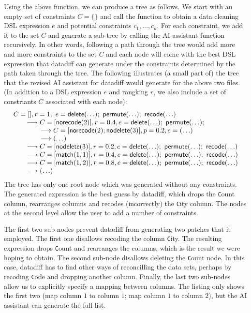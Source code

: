 \documentclass{article}
\begin{document}
Using the above function, we can produce a tree as follows. We start with an empty set of 
constraints $C=\{\}$ and call the function to obtain a data cleaning DSL expression $e$ and
potential constraints $c_1, \ldots, c_k$. For each constraint, we add it to the set $C$ and
generate a sub-tree by calling the AI assistant function recursively. In other words, following
a path through the tree would add more and more constraints to the set $C$ and each node will
come with the best DSL expression that datadiff can generate under the constraints determined
by the path taken through the tree. The following illustrates (a small part of) the tree that 
the revised AI assistant for datadiff would generate for the above two files. (In addition to a DSL 
expression $e$ and rangking $r$, we also include a set of constriants $C$ associated with each 
node):
%
\begin{equation*}
\begin{array}{l}
C=[], r=1,~ e=\textnormal{\sffamily delete}(\ldots);~ \textnormal{\sffamily permute}(\ldots);~ \textnormal{\sffamily recode}(\ldots)\\
\qquad\longrightarrow C=[\textnormal{\sffamily norecode}(2)], r=0.4, e=\textnormal{\sffamily delete}(\ldots);~ \textnormal{\sffamily permute}(\ldots);\\
\qquad\qquad\longrightarrow C=[\textnormal{\sffamily norecode}(2); \textnormal{\sffamily nodelete}(3)], p=0.2, e=(\ldots)\\
\qquad\qquad\longrightarrow (\ldots)\\
\qquad\longrightarrow C=[\textnormal{\sffamily nodelete}(3)], r=0.2, e=\textnormal{\sffamily delete}(\ldots);~ \textnormal{\sffamily permute}(\ldots);~ \textnormal{\sffamily recode}(\ldots)\\
\qquad\longrightarrow C=[\textnormal{\sffamily match}(1,1)], r=0.4, e=\textnormal{\sffamily delete}(\ldots);~ \textnormal{\sffamily permute}(\ldots);~ \textnormal{\sffamily recode}(\ldots)\\
\qquad\longrightarrow C=[\textnormal{\sffamily match}(1,2)], r=0.8, e=\textnormal{\sffamily delete}(\ldots);~ \textnormal{\sffamily permute}(\ldots);~ \textnormal{\sffamily recode}(\ldots)\\
\qquad\longrightarrow (\ldots)
\end{array}
\end{equation*}
%
The tree has only one root node which was generated without any constraints. The generated expression
is the best guess by datadiff, which drops the {\texttt Count} column, rearranges columns and recodes
(incorrectly) the {\texttt City} column. The nodes at the second level allow the user to add a
number of constraints. 

\newpage
The first two sub-nodes prevent datadiff from generating two patches that it employed. The first one
disallows recoding the column {\texttt City}. The resulting expression drops {\texttt Count} and
rearranges the columns, which is the result we were hoping to obtain. 
The second sub-node disallows deleting the {\texttt Count} node. In this case, datadiff has to
find other ways of reconcilling the data sets, perhaps by recoding {\texttt Code} and dropping
another column. Finally, the last two sub-nodes allow us to explicitly specify a mapping between
columns. The listing only shows the first two (map column $1$ to column $1$; map column $1$ to column $2$),
but the AI assistant can generate the full list.
\end{document}
